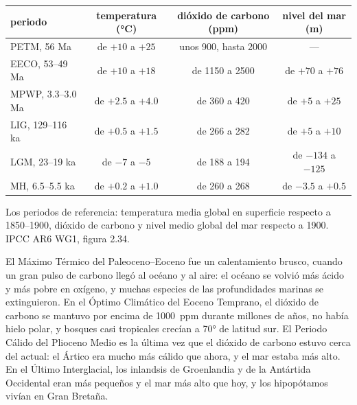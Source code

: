 \begin{center}
\small
\begin{tabular}{|l|c|c|c|}
\hline
\textbf{periodo} & \textbf{temperatura (\unit{\degreeCelsius})} & \textbf{dióxido de carbono (ppm)} & \textbf{nivel del mar (m)} \\
\hline
PETM, 56 Ma & de $+10$ a $+25$ & unos 900, hasta 2000 & --- \\
EECO, 53--49 Ma & de $+10$ a $+18$ & de 1150 a 2500 & de $+70$ a $+76$ \\
MPWP, 3.3--3.0 Ma & de $+2.5$ a $+4.0$ & de 360 a 420 & de $+5$ a $+25$ \\
LIG, 129--116 ka & de $+0.5$ a $+1.5$ & de 266 a 282 & de $+5$ a $+10$ \\
\textcolor{omCold}{LGM, 23--19 ka} & \textcolor{omCold}{de $-7$ a $-5$} & \textcolor{omCold}{de 188 a 194} & \textcolor{omCold}{de $-134$ a $-125$} \\
MH, 6.5--5.5 ka & de $+0.2$ a $+1.0$ & de 260 a 268 & de $-3.5$ a $+0.5$ \\
\hline
\end{tabular}

\medskip
{\small Los periodos de referencia: temperatura media global en superficie respecto a
1850--1900, dióxido de carbono y nivel medio global del mar respecto a 1900. IPCC
AR6 WG1, figura 2.34.}
\end{center}

El Máximo Térmico del Paleoceno--Eoceno fue un calentamiento brusco, cuando un gran
pulso de carbono llegó al océano y al aire: el océano se volvió más ácido
y más pobre en oxígeno, y muchas especies de las profundidades marinas se extinguieron. En el Óptimo
Climático del Eoceno Temprano, el dióxido de carbono se mantuvo por encima de \qty{1000}{ppm} durante
millones de años, no había hielo polar, y bosques casi tropicales crecían
a \ang{70} de latitud sur. El Periodo Cálido del Plioceno Medio es la última vez que el dióxido
de carbono estuvo cerca del actual: el Ártico era mucho más cálido que ahora, y el mar
estaba más alto. En el Último Interglacial, los inlandsis de Groenlandia y de la Antártida
Occidental eran más pequeños y el mar más alto que hoy, y los hipopótamos vivían
en Gran Bretaña.


